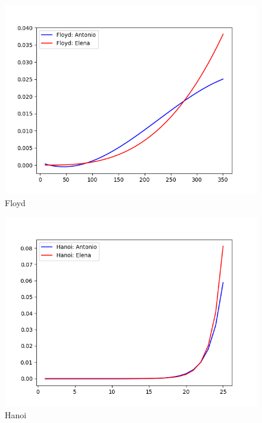 \documentclass[11pt]{article}
\begin{document}
\begin{figure}
\centering
\includegraphics[scale=0.7]{../graficos/distintos/floyd.png}
\caption{Floyd}
\end{figure}

\begin{figure}
\centering
\includegraphics[scale=0.7]{../graficos/distintos/Hanoi.png}
\caption{Hanoi}
\end{figure}
\end{document}
